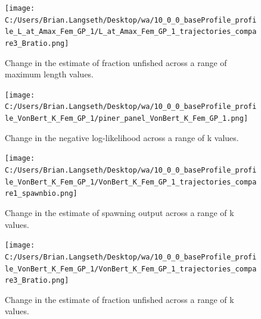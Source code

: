 \documentclass[11pt,
  english,
  letterpaper,
]{article}
\begin{document}
\tagmcend\tagstructend


\begin{figure}
\centering
\texttt{[image: C:/Users/Brian.Langseth/Desktop/wa/10\_0\_0\_baseProfile\_profile\_L\_at\_Amax\_Fem\_GP\_1/L\_at\_Amax\_Fem\_GP\_1\_trajectories\_compare3\_Bratio.png]}
\caption{Change in the estimate of fraction unfished across a range of maximum length values.\label{fig:linf-depl}}
\end{figure}

\tagmcend\tagstructend


\begin{figure}
\centering
\texttt{[image: C:/Users/Brian.Langseth/Desktop/wa/10\_0\_0\_baseProfile\_profile\_VonBert\_K\_Fem\_GP\_1/piner\_panel\_VonBert\_K\_Fem\_GP\_1.png]}
\caption{Change in the negative log-likelihood across a range of k values.\label{fig:k-profile}}
\end{figure}

\tagmcend\tagstructend


\begin{figure}
\centering
\texttt{[image: C:/Users/Brian.Langseth/Desktop/wa/10\_0\_0\_baseProfile\_profile\_VonBert\_K\_Fem\_GP\_1/VonBert\_K\_Fem\_GP\_1\_trajectories\_compare1\_spawnbio.png]}
\caption{Change in the estimate of spawning output across a range of k values.\label{fig:k-ssb}}
\end{figure}

\tagmcend\tagstructend


\begin{figure}
\centering
\texttt{[image: C:/Users/Brian.Langseth/Desktop/wa/10\_0\_0\_baseProfile\_profile\_VonBert\_K\_Fem\_GP\_1/VonBert\_K\_Fem\_GP\_1\_trajectories\_compare3\_Bratio.png]}
\caption{Change in the estimate of fraction unfished across a range of k values.\label{fig:k-depl}}
\end{figure}
\end{document}
